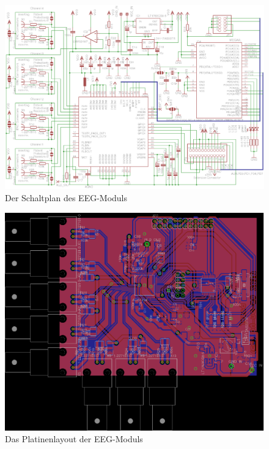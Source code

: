 \documentclass[12pt,a4paper,notitlepage]{article}
\begin{document}
\begin{landscape}
\begin{figure}
\begin{center}
\includegraphics{images/adc_schematic_02.eps}
\caption{Der Schaltplan des EEG-Moduls}
\label{adc_schematic}
\end{center}
\end{figure}
\end{landscape}

\begin{figure}
\centering
\includegraphics{images/adc_board_03.eps}%
\caption{Das Platinenlayout der EEG-Moduls}
\label{adc_board}
\end{figure}
\end{document}
